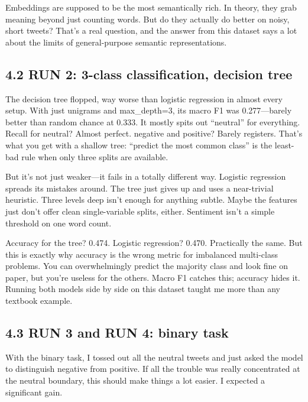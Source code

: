 \documentclass[12pt]{article}
\begin{document}
Embeddings are supposed to be the most semantically rich. In theory, they grab meaning beyond just counting words. But do they actually do better on noisy, short tweets? That's a real question, and the answer from this dataset says a lot about the limits of general-purpose semantic representations.



\subsection*{4.2 RUN 2: 3-class classification, decision tree}



The decision tree flopped, way worse than logistic regression in almost every setup. With just unigrams and max\_depth=3, its macro F1 was 0.277---barely better than random chance at 0.333. It mostly spits out ``neutral'' for everything. Recall for neutral? Almost perfect. negative and positive? Barely registers. That's what you get with a shallow tree: ``predict the most common class'' is the least-bad rule when only three splits are available.

But it's not just weaker---it fails in a totally different way. Logistic regression spreads its mistakes around. The tree just gives up and uses a near-trivial heuristic. Three levels deep isn't enough for anything subtle. Maybe the features just don't offer clean single-variable splits, either. Sentiment isn't a simple threshold on one word count.

Accuracy for the tree? 0.474. Logistic regression? 0.470. Practically the same. But this is exactly why accuracy is the wrong metric for imbalanced multi-class problems. You can overwhelmingly predict the majority class and look fine on paper, but you're useless for the others. Macro F1 catches this; accuracy hides it. Running both models side by side on this dataset taught me more than any textbook example.



\subsection*{4.3 RUN 3 and RUN 4: binary task}



With the binary task, I tossed out all the neutral tweets and just asked the model to distinguish negative from positive. If all the trouble was really concentrated at the neutral boundary, this should make things a lot easier. I expected a significant gain.
\end{document}
